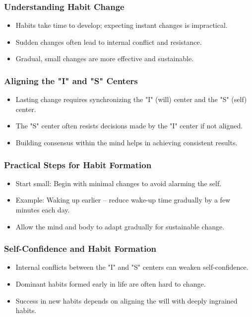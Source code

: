 \begin{frame}[fragile]\frametitle{Understanding Habit Change}
    \begin{itemize}
        \item Habits take time to develop; expecting instant changes is impractical.
        \item Sudden changes often lead to internal conflict and resistance.
        \item Gradual, small changes are more effective and sustainable.
    \end{itemize}
\end{frame}

\begin{frame}[fragile]\frametitle{Aligning the "I" and "S" Centers}
    \begin{itemize}
        \item Lasting change requires synchronizing the "I" (will) center and the "S" (self) center.
        \item The "S" center often resists decisions made by the "I" center if not aligned.
        \item Building consensus within the mind helps in achieving consistent results.
    \end{itemize}
\end{frame}

\begin{frame}[fragile]\frametitle{Practical Steps for Habit Formation}
    \begin{itemize}
        \item Start small: Begin with minimal changes to avoid alarming the self.
        \item Example: Waking up earlier – reduce wake-up time gradually by a few minutes each day.
        \item Allow the mind and body to adapt gradually for sustainable change.
    \end{itemize}
\end{frame}

\begin{frame}[fragile]\frametitle{Self-Confidence and Habit Formation}
    \begin{itemize}
        \item Internal conflicts between the "I" and "S" centers can weaken self-confidence.
        \item Dominant habits formed early in life are often hard to change.
        \item Success in new habits depends on aligning the will with deeply ingrained habits.
    \end{itemize}
\end{frame}

